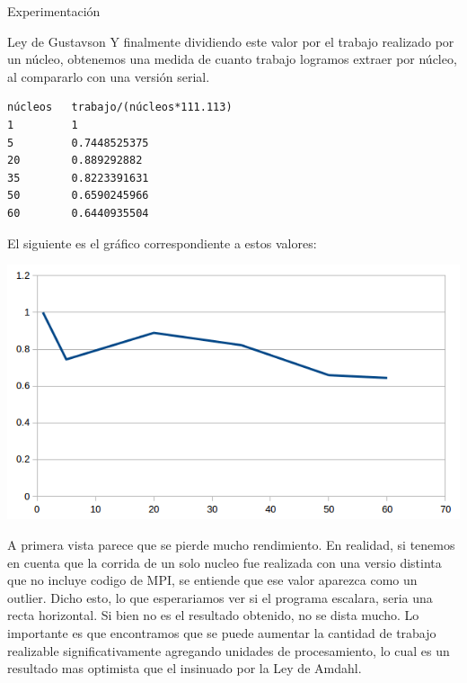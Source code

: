 \begin{section}{Experimentación}
\begin{subsection}{Ley de Gustavson}
Y finalmente dividiendo este valor por el trabajo realizado por un núcleo, obtenemos una medida de cuanto trabajo logramos extraer por núcleo, al compararlo con una versión serial.
\newpage
\begin{verbatim}
núcleos   trabajo/(núcleos*111.113)
1         1
5         0.7448525375
20        0.889292882
35        0.8223391631
50        0.6590245966
60        0.6440935504
\end{verbatim}
El siguiente es el gráfico correspondiente a estos valores:

\includegraphics{Gustavson2}

 A primera vista parece que se pierde mucho rendimiento. En realidad, si tenemos en cuenta que la corrida de un solo nucleo fue realizada con una versio distinta que no incluye codigo de MPI, se entiende que ese valor aparezca como un outlier. Dicho esto, lo que esperariamos ver si el programa escalara, seria una recta horizontal. Si bien no es el resultado obtenido, no se dista mucho. Lo importante es que encontramos que se puede aumentar la cantidad de trabajo realizable significativamente agregando unidades de procesamiento, lo cual es un resultado mas optimista que el insinuado por la Ley de Amdahl.

\end{subsection}
\end{section}

